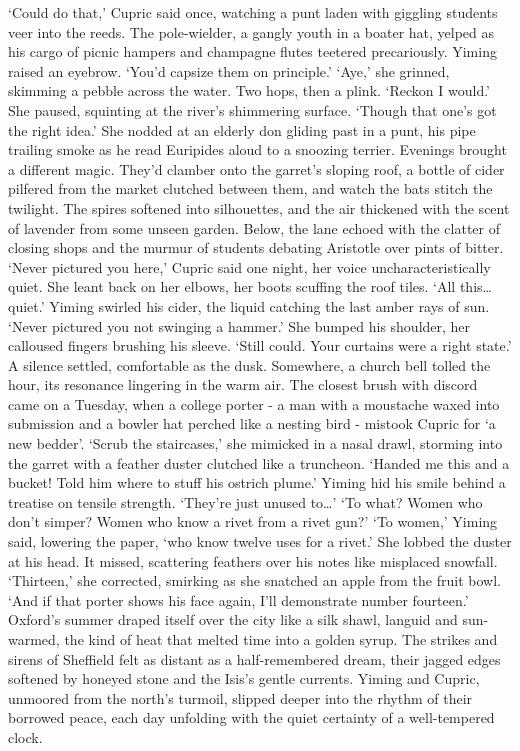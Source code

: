 `Could do that,' Cupric said once, watching a punt laden with giggling students veer into the reeds. The pole-wielder, a gangly youth in a boater hat, yelped as his cargo of picnic hampers and champagne flutes teetered precariously.
Yiming raised an eyebrow. `You'd capsize them on principle.'
`Aye,' she grinned, skimming a pebble across the water. Two hops, then a plink. `Reckon I would.' She paused, squinting at the river's shimmering surface. `Though that one's got the right idea.' She nodded at an elderly don gliding past in a punt, his pipe trailing smoke as he read Euripides aloud to a snoozing terrier.
Evenings brought a different magic. They'd clamber onto the garret's sloping roof, a bottle of cider pilfered from the market clutched between them, and watch the bats stitch the twilight. The spires softened into silhouettes, and the air thickened with the scent of lavender from some unseen garden. Below, the lane echoed with the clatter of closing shops and the murmur of students debating Aristotle over pints of bitter.
`Never pictured you here,' Cupric said one night, her voice uncharacteristically quiet. She leant back on her elbows, her boots scuffing the roof tiles. `All this… quiet.'
Yiming swirled his cider, the liquid catching the last amber rays of sun. `Never pictured you not swinging a hammer.'
She bumped his shoulder, her calloused fingers brushing his sleeve. `Still could. Your curtains were a right state.'
A silence settled, comfortable as the dusk. Somewhere, a church bell tolled the hour, its resonance lingering in the warm air.
The closest brush with discord came on a Tuesday, when a college porter - a man with a moustache waxed into submission and a bowler hat perched like a nesting bird - mistook Cupric for `a new bedder'.
`Scrub the staircases,' she mimicked in a nasal drawl, storming into the garret with a feather duster clutched like a truncheon. `Handed me this and a bucket! Told him where to stuff his ostrich plume.'
Yiming hid his smile behind a treatise on tensile strength. `They're just unused to…'
`To what? Women who don't simper? Women who know a rivet from a rivet gun?'
`To women,' Yiming said, lowering the paper, `who know twelve uses for a rivet.'
She lobbed the duster at his head. It missed, scattering feathers over his notes like misplaced snowfall.
`Thirteen,' she corrected, smirking as she snatched an apple from the fruit bowl. `And if that porter shows his face again, I'll demonstrate number fourteen.'
Oxford's summer draped itself over the city like a silk shawl, languid and sun-warmed, the kind of heat that melted time into a golden syrup. The strikes and sirens of Sheffield felt as distant as a half-remembered dream, their jagged edges softened by honeyed stone and the Isis's gentle currents. Yiming and Cupric, unmoored from the north's turmoil, slipped deeper into the rhythm of their borrowed peace, each day unfolding with the quiet certainty of a well-tempered clock.
